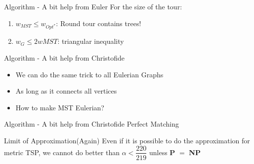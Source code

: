 \documentclass{beamer}
\begin{document}
\begin{frame}{Algorithm - A bit help from Euler}
    For the size of the tour:
    \begin{enumerate}
        \item $w_{MST} \leq w_{Opt^*}$: Round tour contains trees!
        \item $w_G \leq 2w{MST}$: triangular inequality
    \end{enumerate}
\end{frame}

\begin{frame}{Algorithm - A bit help from Christofide}
\begin{itemize}
    \item We can do the same trick to all Eulerian Graphs
    \item As long as it connects all vertices 
    \item How to make MST Eulerian?
\end{itemize}
\end{frame}

\begin{frame}{Algorithm - A bit help from Christofide}
    Perfect Matching
\end{frame}

\begin{frame}{Limit of Approximation(Again)}
    Even if it is possible to do the approximation for metric TSP, we cannot do better than $\alpha < \dfrac{220}{219}$
    unless \textbf{P} $=$ \textbf{NP}
\end{frame}
\end{document}
